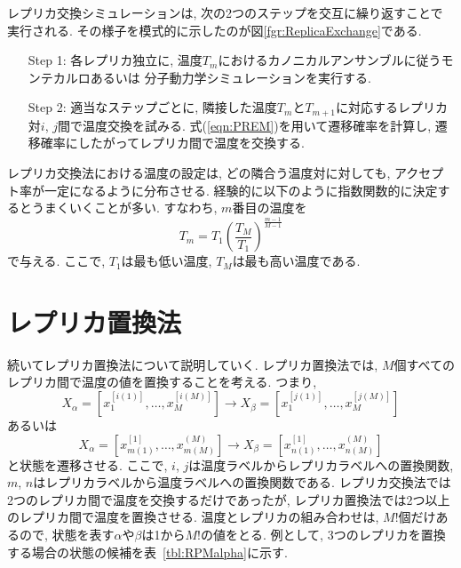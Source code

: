 レプリカ交換シミュレーションは, 次の2つのステップを交互に繰り返すことで実行される. その様子を模式的に示したのが図\ref{fgr:ReplicaExchange}である.

\begin{enumerate}
 \setlength{\leftskip}{0.4cm}
 \item[Step 1:]
 	各レプリカ独立に, 温度$T_{m}$におけるカノニカルアンサンブルに従うモンテカルロあるいは 分子動力学シミュレーションを実行する.

 \item[Step 2:]
 	適当なステップごとに, 隣接した温度$T_{m}$と$T_{m+1}$に対応するレプリカ対$i$, $j$間で温度交換を試みる.
	式(\ref{eqn:PREM})を用いて遷移確率を計算し, 遷移確率にしたがってレプリカ間で温度を交換する.
\end{enumerate}

レプリカ交換法における温度の設定は, どの隣合う温度対に対しても, アクセプト率が一定になるように分布させる.
経験的に以下のように指数関数的に決定するとうまくいくことが多い.
すなわち, $m$番目の温度を
\begin{equation}
 T_{m} = T_{1} \left( \frac{T_{M}}{T_{1}} \right)^{\frac{m-1}{M-1}}
\end{equation}
で与える. ここで, $T_{1}$は最も低い温度, $T_{M}$は最も高い温度である.

\section{\label{sec:level2-3}レプリカ置換法}
続いてレプリカ置換法\cite{Itoh2013JCTC}について説明していく.
レプリカ置換法では, $M$個すべてのレプリカ間で温度の値を置換することを考える. つまり,
\begin{equation}
 X_{\alpha} = \left[x_{1}^{[i(1)]},\dots,x_{M}^{[i(M)]} \right] \to  X_{\beta} = \left[x_{1}^{[j(1)]},\dots,x_{M}^{[j(M)]}\right]
\end{equation}
あるいは
\begin{equation}
 X_{\alpha} = \left[x_{m(1)}^{[1]},\dots,x_{m(M)}^{(M)} \right] \to  X_{\beta} = \left[x_{n(1)}^{[1]},\dots,x_{n(M)}^{(M)}\right]
\end{equation}
と状態を遷移させる.
ここで, $i$, $j$は温度ラベルからレプリカラベルへの置換関数,  $m$, $n$はレプリカラベルから温度ラベルへの置換関数である.
レプリカ交換法では2つのレプリカ間で温度を交換するだけであったが, レプリカ置換法では2つ以上のレプリカ間で温度を置換させる.
温度とレプリカの組み合わせは, $M!$個だけあるので, 状態を表す$\alpha$や$\beta$は1から$M!$の値をとる.
例として, 3つのレプリカを置換する場合の状態の候補を表~\ref{tbl:RPMalpha}に示す.

